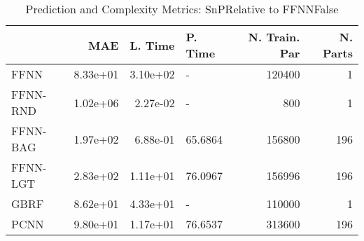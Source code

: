\begin{table}
\centering
\caption{Prediction and Complexity Metrics: SnPRelative to FFNNFalse}
\label{tab__SnP__Fix_Neurons_QTrue}
\begin{tabular}{lrrlrr}
\toprule
{} &      MAE &  L. Time &  P. Time &  N. Train. Par &  N. Parts \\
\midrule
FFNN     & 8.33e+01 & 3.10e+02 &        - &         120400 &         1 \\
FFNN-RND & 1.02e+06 & 2.27e-02 &        - &            800 &         1 \\
FFNN-BAG & 1.97e+02 & 6.88e-01 &  65.6864 &         156800 &       196 \\
FFNN-LGT & 2.83e+02 & 1.11e+01 &  76.0967 &         156996 &       196 \\
GBRF     & 8.62e+01 & 4.33e+01 &        - &         110000 &         1 \\
PCNN     & 9.80e+01 & 1.17e+01 &  76.6537 &         313600 &       196 \\
\bottomrule
\end{tabular}
\end{table}
